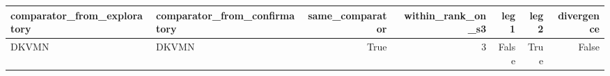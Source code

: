 \begin{tabular}{llrrrrr}
\toprule
comparator\_from\_exploratory & comparator\_from\_confirmatory & same\_comparator & within\_rank\_on\_s3 & leg1 & leg2 & divergence \\
\midrule
DKVMN & DKVMN & True & 3 & False & True & False \\
\bottomrule
\end{tabular}
